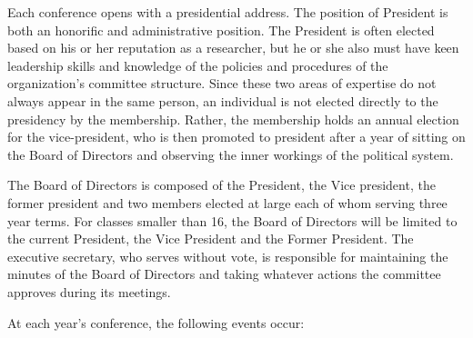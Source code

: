 Each conference opens with a presidential address. The position of President is both an honorific and administrative position. The President is often elected based on his or her reputation as a researcher, but he or she also must have keen leadership skills and knowledge of the policies and procedures of the organization's committee structure. Since these two areas of expertise do not always appear in the same person, an individual is not elected directly to the presidency by the membership. Rather, the membership holds an annual election for the vice-president, who is then promoted to president after a year of sitting on the Board of Directors and observing the inner workings of the political system.

The Board of Directors is composed of the President, the Vice president, the former president and two members elected at large each of whom serving three year terms. For classes smaller than 16, the Board of Directors will be limited to the current President, the Vice President and the Former President. The executive secretary, who serves without vote, is responsible for maintaining the minutes of the Board of Directors and taking whatever actions the committee approves during its meetings.

At each year's conference, the following events occur:


